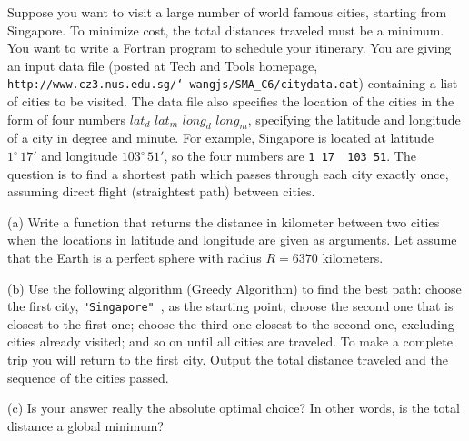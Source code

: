 \medskip
\item{} Suppose you want to visit a large number of world famous
cities, starting from Singapore.  To minimize cost, 
the total distances traveled must be a
minimum.  You want to write a Fortran program to schedule your itinerary.
You are giving an input data file (posted at Tech and Tools homepage,
{\tt http://www.cz3.nus.edu.sg/\char`~wangjs/SMA\_C6/citydata.dat})
containing a list of cities to be visited.
The data file also specifies the location of the cities in the form of 
four numbers $lat_d$ $lat_m$ $long_d$ $long_m$, specifying the 
latitude and longitude of a city in degree and minute.  For example,
Singapore is located at latitude $1^\circ\,17'$ and longitude
$103^\circ\,51'$, so the four numbers are {\tt 1 17 \ 103 51}.
The question is to find a shortest path which passes through each city
exactly once, assuming direct flight (straightest path) between cities.
\item{} (a) Write a function that returns the distance in kilometer
between two cities when the locations in latitude and longitude are
given as arguments.  Let assume that the Earth is a perfect sphere with
radius $R = 6370$ kilometers. 
\item{} (b) Use the following algorithm (Greedy Algorithm)
to find the best path: choose
the first city, {\tt "Singapore" },
as the starting point; choose the second one that is
closest to the first one; choose the third one closest to the second 
one, excluding cities already visited;
and so on until all cities are traveled. To make a complete trip 
you will return to the first city.   Output the total distance
traveled and the sequence of the cities passed.
\item{} (c) Is your answer really the absolute optimal choice?  
In other words, is the total distance a global minimum?

\bye

